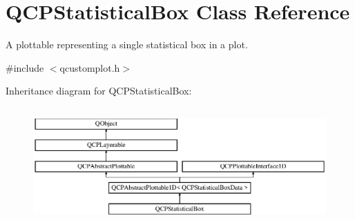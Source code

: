 \hypertarget{class_q_c_p_statistical_box}{}\section{Q\+C\+P\+Statistical\+Box Class Reference}
\label{class_q_c_p_statistical_box}


A plottable representing a single statistical box in a plot.  




{\ttfamily \#include $<$qcustomplot.\+h$>$}

Inheritance diagram for Q\+C\+P\+Statistical\+Box\+:\begin{figure}[H]
\begin{center}
\leavevmode
\includegraphics[height=4.530744cm]{de/d8d/class_q_c_p_statistical_box}
\end{center}
\end{figure}

